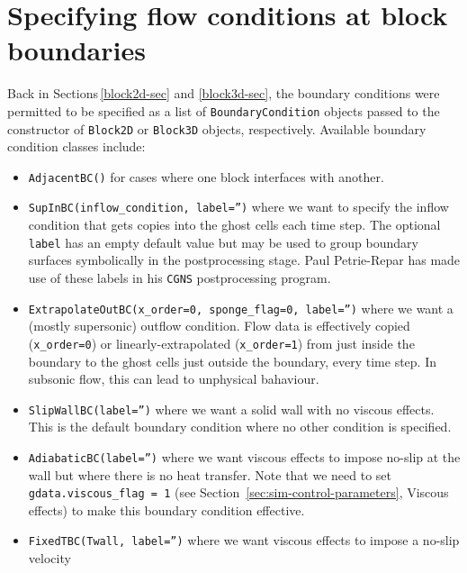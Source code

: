 \section{Specifying flow conditions at block boundaries}
\label{boundary-conditions-sec}
%
Back in Sections\,\ref{block2d-sec} and \ref{block3d-sec}, 
the boundary conditions were permitted to be specified as a list of 
\texttt{BoundaryCondition} objects passed to the constructor of \texttt{Block2D} 
or \texttt{Block3D} objects, respectively.
Available boundary condition classes include:
  \begin{itemize}
    \item \texttt{AdjacentBC()} for cases where one block interfaces with another.
    \item \texttt{SupInBC(inflow\_condition, label='')} where we want to specify the inflow condition
      that gets copies into the ghost cells each time step.
      The optional \texttt{label} has an empty default value but may be used to group boundary surfaces symbolically
      in the postprocessing stage.
      Paul Petrie-Repar has made use of these labels in his \texttt{CGNS} postprocessing program.
    \item \texttt{ExtrapolateOutBC(x\_order=0, sponge\_flag=0, label='')} where we want a (mostly supersonic) outflow
      condition.
      Flow data is effectively copied (\texttt{x\_order=0}) or linearly-extrapolated (\texttt{x\_order=1})
      from just inside the boundary to the ghost cells just outside the boundary, every time step.
      In subsonic flow, this can lead to unphysical bahaviour.
    \item \texttt{SlipWallBC(label='')} where we want a solid wall with no viscous effects.
      This is the default boundary condition where no other condition is specified.
    \item \texttt{AdiabaticBC(label='')} where we want viscous effects to impose no-slip at the wall
      but where there is no heat transfer. 
      Note that we need to set \verb!gdata.viscous_flag = 1! (see Section~\ref{sec:sim-control-parameters}, Viscous effects) 
      to make this boundary condition effective.
    \item \texttt{FixedTBC(Twall, label='')} where we want viscous effects to impose a no-slip velocity 

\end{itemize}
